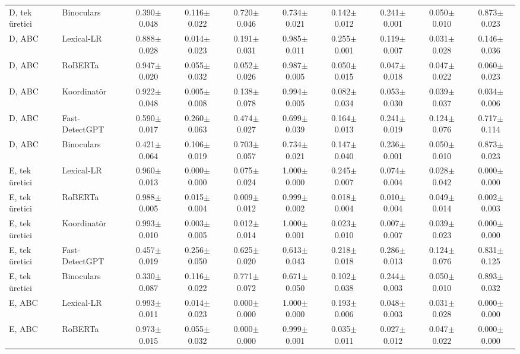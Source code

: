 \begin{table}[t]
\begin{tabular}{@{}llcccccccc@{}}
D, tek üretici & Binoculars & 0.390$\pm$0.048 & 0.116$\pm$0.022 & 0.720$\pm$0.046 & 0.734$\pm$0.021 & 0.142$\pm$0.012 & 0.241$\pm$0.001 & 0.050$\pm$0.010 & 0.873$\pm$0.023 \\
D, ABC & Lexical-LR & 0.888$\pm$0.028 & 0.014$\pm$0.023 & 0.191$\pm$0.031 & 0.985$\pm$0.011 & 0.255$\pm$0.001 & 0.119$\pm$0.007 & 0.031$\pm$0.028 & 0.146$\pm$0.036 \\
D, ABC & RoBERTa & 0.947$\pm$0.020 & 0.055$\pm$0.032 & 0.052$\pm$0.026 & 0.987$\pm$0.005 & 0.050$\pm$0.015 & 0.047$\pm$0.018 & 0.047$\pm$0.022 & 0.060$\pm$0.023 \\
D, ABC & Koordinatör & 0.922$\pm$0.048 & 0.005$\pm$0.008 & 0.138$\pm$0.078 & 0.994$\pm$0.005 & 0.082$\pm$0.034 & 0.053$\pm$0.030 & 0.039$\pm$0.037 & 0.034$\pm$0.006 \\
D, ABC & Fast-DetectGPT & 0.590$\pm$0.017 & 0.260$\pm$0.063 & 0.474$\pm$0.027 & 0.699$\pm$0.039 & 0.164$\pm$0.013 & 0.241$\pm$0.019 & 0.124$\pm$0.076 & 0.717$\pm$0.114 \\
D, ABC & Binoculars & 0.421$\pm$0.064 & 0.106$\pm$0.019 & 0.703$\pm$0.057 & 0.734$\pm$0.021 & 0.147$\pm$0.040 & 0.236$\pm$0.001 & 0.050$\pm$0.010 & 0.873$\pm$0.023 \\
E, tek üretici & Lexical-LR & 0.960$\pm$0.013 & 0.000$\pm$0.000 & 0.075$\pm$0.024 & 1.000$\pm$0.000 & 0.245$\pm$0.007 & 0.074$\pm$0.004 & 0.028$\pm$0.042 & 0.000$\pm$0.000 \\
E, tek üretici & RoBERTa & 0.988$\pm$0.005 & 0.015$\pm$0.004 & 0.009$\pm$0.012 & 0.999$\pm$0.002 & 0.018$\pm$0.004 & 0.010$\pm$0.004 & 0.049$\pm$0.014 & 0.002$\pm$0.003 \\
E, tek üretici & Koordinatör & 0.993$\pm$0.010 & 0.003$\pm$0.005 & 0.012$\pm$0.014 & 1.000$\pm$0.001 & 0.023$\pm$0.010 & 0.007$\pm$0.007 & 0.039$\pm$0.023 & 0.000$\pm$0.000 \\
E, tek üretici & Fast-DetectGPT & 0.457$\pm$0.019 & 0.256$\pm$0.050 & 0.625$\pm$0.020 & 0.613$\pm$0.043 & 0.218$\pm$0.018 & 0.286$\pm$0.013 & 0.124$\pm$0.076 & 0.831$\pm$0.125 \\
E, tek üretici & Binoculars & 0.330$\pm$0.087 & 0.116$\pm$0.022 & 0.771$\pm$0.072 & 0.671$\pm$0.050 & 0.102$\pm$0.038 & 0.244$\pm$0.003 & 0.050$\pm$0.010 & 0.893$\pm$0.032 \\
E, ABC & Lexical-LR & 0.993$\pm$0.011 & 0.014$\pm$0.023 & 0.000$\pm$0.000 & 1.000$\pm$0.000 & 0.193$\pm$0.006 & 0.048$\pm$0.003 & 0.031$\pm$0.028 & 0.000$\pm$0.000 \\
E, ABC & RoBERTa & 0.973$\pm$0.015 & 0.055$\pm$0.032 & 0.000$\pm$0.000 & 0.999$\pm$0.001 & 0.035$\pm$0.011 & 0.027$\pm$0.012 & 0.047$\pm$0.022 & 0.000$\pm$0.000 \\

\end{tabular}
\end{table}
